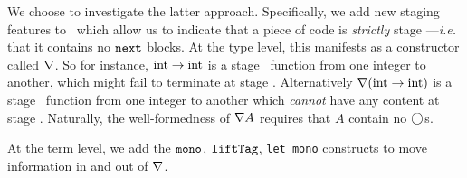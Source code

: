 We choose to investigate the latter approach.
Specifically, we add new staging features to \lang\ which allow us to indicate that a piece of code is {\em strictly} 
stage \bbone---{\em i.e.} that it contains no ${\tt next}$ blocks.
At the type level, this manifests as a constructor called $\nabla$.
So for instance, ${\rm int} \to {\rm int}$ is a stage \bbone\ function from one integer to another,
which might fail to terminate at stage \bbtwo.  
Alternatively $\nabla ({\rm int} \to {\rm int})$ is a stage \bbone\ function from one integer to another
which {\em cannot} have any content at stage \bbtwo.
Naturally, the well-formedness of $\nabla A$ requires that $A$ contain no $\bigcirc$s.

At the term level, we add the ${\tt mono}$, ${\tt liftTag}$, \texttt{let mono} constructs to move information
in and out of $\nabla$.


